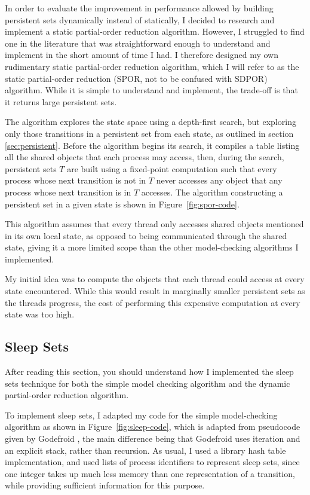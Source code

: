 \documentclass[12pt,a4paper,twoside,openright]{report}
\begin{document}
In order to evaluate the improvement in performance
allowed by building persistent sets dynamically
instead of statically, I decided to research and
implement a static partial-order reduction
algorithm. However, I struggled to find one
in the literature that was straightforward enough
to understand and implement in the short amount
of time I had. I therefore designed my own
rudimentary static partial-order reduction algorithm,
which I will refer to as the static partial-order reduction
(SPOR, not to be confused with SDPOR) algorithm.
While it is simple to understand and implement,
the trade-off is that it returns large persistent sets.

The algorithm explores the state space using a
depth-first search, but exploring only those
transitions in a persistent set from each
state, as outlined in section \ref{sec:persistent}.
Before the algorithm begins its search, it compiles a table
listing all the shared objects that each process may
access, then, during the search, persistent sets $T$ are built
using a fixed-point computation such that
every process whose next transition is
not in $T$ never accesses any
object that any process whose next
transition is in $T$ accesses.
The algorithm constructing a persistent set in a given state
is shown in Figure~\ref{fig:spor-code}.

This algorithm assumes that every thread only
accesses shared objects mentioned in its own
local state, as opposed to being communicated
through the shared state, giving it a more
limited scope than the other model-checking
algorithms I implemented.

My initial idea was to compute the objects that
each thread could access at every state encountered.
While this would result in marginally smaller
persistent sets as the threads progress, the cost
of performing this expensive computation at
every state was too high.


\subsection{Sleep Sets}
After reading this section, you
should understand how I implemented
the sleep sets technique for both the
simple model checking algorithm and
the dynamic partial-order reduction
algorithm.

To implement sleep sets, I adapted my
code for the simple model-checking
algorithm as shown in Figure~\ref{fig:sleep-code},
which is adapted from pseudocode
given by Godefroid \cite{god96}, the main
difference being that Godefroid uses
iteration and an explicit stack, rather
than recursion. As usual, I used a
library hash table implementation,
and used lists of process identifiers
to represent sleep sets, since one
integer takes up much less memory
than one representation of a transition,
while providing sufficient information
for this purpose.
\end{document}
